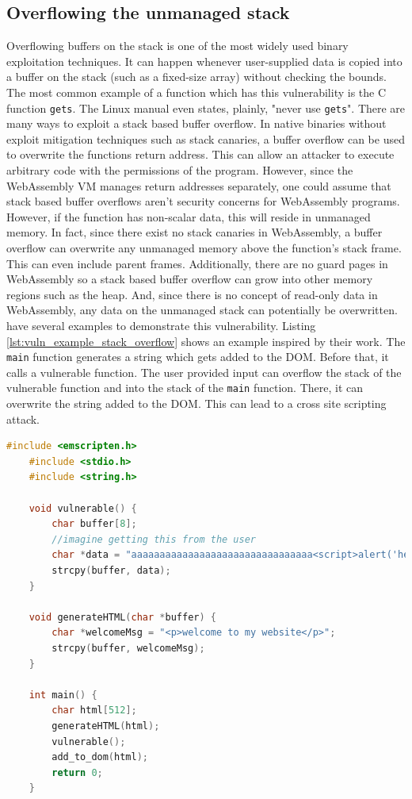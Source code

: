 \documentclass[sigconf]{acmart}
\begin{document}
\subsection{Overflowing the unmanaged stack}
\label{sec:stack_buffer_overflow}
Overflowing buffers on the stack is one of the most widely used binary exploitation techniques. It can happen whenever user-supplied data is copied into a buffer on the stack (such as a fixed-size array) without checking the bounds. The most common example of a function which has this vulnerability is the C function \texttt{gets}. The Linux manual even states, plainly, "never use \texttt{gets}". There are many ways to exploit a stack based buffer overflow. In native binaries without exploit mitigation techniques such as stack canaries, a buffer overflow can be used to overwrite the functions return address. This can allow an attacker to execute arbitrary code with the permissions of the program. However, since the WebAssembly VM manages return addresses separately, one could assume that stack based buffer overflows aren't security concerns for WebAssembly programs. However, if the function has non-scalar data, this will reside in unmanaged memory. In fact, since there exist no stack canaries in WebAssembly, a buffer overflow can overwrite any unmanaged memory above the function's stack frame. This can even include parent frames. Additionally, there are no guard pages in WebAssembly so a stack based buffer overflow can grow into other memory regions such as the heap. And, since there is no concept of read-only data in WebAssembly, any data on the unmanaged stack can potentially be overwritten. \citet{lehmann_everything_2020} have several examples to demonstrate this vulnerability. Listing \ref{lst:vuln_example_stack_overflow} shows an example inspired by their work. The \texttt{main} function generates a string which gets added to the DOM. Before that, it calls a vulnerable function. The user provided input can overflow the stack of the vulnerable function and into the stack of the \texttt{main} function. There, it can overwrite the string added to the DOM. This can lead to a cross site scripting attack. 
\newpage

\begin{lstlisting}[language=C++, caption={This C program has a stack overflow vulnerability. This can be exploited by the user supplying a buffer which overflows into the parent frame and replaces the string meant to be added to the DOM.}, label={lst:vuln_example_stack_overflow}]
	#include <emscripten.h>
	#include <stdio.h>
	#include <string.h>

	void vulnerable() {
		char buffer[8];
		//imagine getting this from the user
		char *data = "aaaaaaaaaaaaaaaaaaaaaaaaaaaaaaaa<script>alert('hello')</script>";
		strcpy(buffer, data);
	}

	void generateHTML(char *buffer) {
		char *welcomeMsg = "<p>welcome to my website</p>";
		strcpy(buffer, welcomeMsg);
	}

	int main() {
		char html[512];
		generateHTML(html);
		vulnerable();
		add_to_dom(html);
		return 0;
	}
\end{lstlisting}
\end{document}
